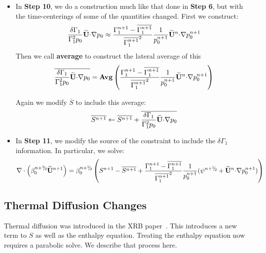 \begin{itemize}
\item In {\bf Step 10}, we do a construction much like that done in {\bf Step 6},
but with the time-centerings of some of the quantities changed.
First we construct:
\begin{equation}
\frac{\delta \Gamma_1}{\Gamma_1^2 p_0} \widetilde{{\bf U}} \mathbf{\cdot} \mathbf{\nabla} p_0 \approx
   \frac{\Gamma_1^{n+1} - \overline{\Gamma_1^{n+1}}}
         {{\overline{\Gamma_1^{n+1}}}^2} \frac{1}{p_0^{n+1}} \widetilde{{\bf U}}^n \mathbf{\cdot} \mathbf{\nabla} p_0^{n+1}
\end{equation}
Then we call {\bf average} to construct the lateral average of this
\begin{equation}
\overline{\frac{\delta \Gamma_1}{\Gamma_1^2 p_0} \widetilde{{\bf U}} \mathbf{\cdot} \mathbf{\nabla} p_0} = 
   \mathbf{Avg} \left (\frac{\Gamma_1^{n+1} - \overline{\Gamma_1^{n+1}}}
         {{\overline{\Gamma_1^{n+1}}}^2} \frac{1}{p_0^{n+1}} \widetilde{{\bf U}}^n \mathbf{\cdot} \mathbf{\nabla} p_0^{n+1} \right )
\end{equation}

Again we modify $\overline{S}$ to include this average:
\begin{equation}
\overline{S^{n+1}} \leftarrow \overline{S^{n+1}} + 
   \overline{\frac{\delta \Gamma_1}{\Gamma_1^2 p_0} \widetilde{{\bf U}} \mathbf{\cdot} \mathbf{\nabla} p_0} 
\end{equation}

\item In {\bf Step 11}, we modify the source of the constraint to include the
$\delta \Gamma_1$ information.  In particular, we solve:
\begin{equation}
\nabla \cdot \left(\beta_0^{\nph} \Ubt^{n+1} \right) 
= \beta_0^{\nph} \left(S^{n+1} - \overline{S^{n+1}} +
   \frac{\Gamma_1^{n+1} - \overline{\Gamma_1^{n+1}}} 
         {{\overline{\Gamma_1^{n+1}}}^2} \frac{1}{p_0^{n+1}}
         (\psi^{\nph} + \Ubt^n \cdotb \nablab p_0^{n+1})
\right)
\end{equation}


\end{itemize}



\subsection{Thermal Diffusion Changes}

\label{sec:flow:diffusion}

Thermal diffusion was introduced in the XRB paper~\cite{xrb}.  This
introduces a new term to $S$ as well as the enthalpy equation.
Treating the enthalpy equation now requires a parabolic solve.  We describe
that process here.

